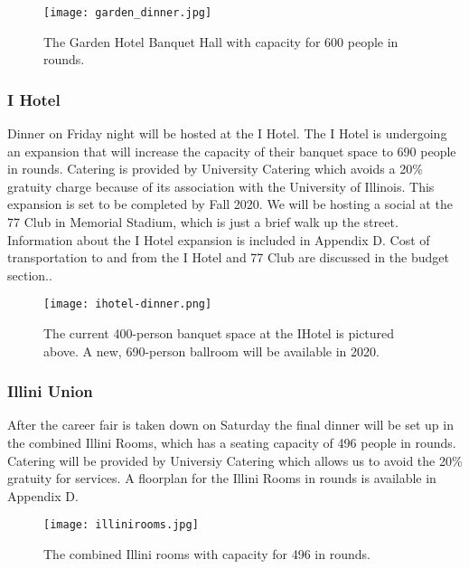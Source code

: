 \begin{figure}[H]
    \centering
    \texttt{[image: garden\_dinner.jpg]}
    \caption{The Garden Hotel Banquet Hall with capacity for 600 people in rounds.}
\end{figure}

\subsubsection{I Hotel}
Dinner on Friday night will be hosted at the I Hotel. The I Hotel is undergoing an expansion that will increase the capacity of their banquet space to 690 people in rounds. Catering is provided by University Catering which avoids a 20\% gratuity charge because of its association with the University of Illinois. This expansion is set to be completed by Fall 2020. We will be hosting a social at the 77 Club in Memorial Stadium, which is just a brief walk up the street. Information about the I Hotel expansion is included in Appendix D. Cost of transportation to and from the I Hotel and 77 Club are discussed in the budget section..

\begin{figure}[H]
    \centering
    \texttt{[image: ihotel-dinner.png]}
    \caption{The current 400-person banquet space at the IHotel is pictured 
        above. A new, 690-person ballroom will be available in 2020.}
\end{figure}

\subsubsection{Illini Union}
After the career fair is taken down on Saturday the final dinner will be set up in the combined Illini Rooms, which has a seating capacity of 496 people in rounds. Catering will be provided by Universiy Catering which allows us to avoid the 20\% gratuity for services. A floorplan for the Illini Rooms in rounds is available in Appendix D.\\

\begin{figure}[H]
    \centering
    \texttt{[image: illinirooms.jpg]}
    \caption{The combined Illini rooms with capacity for 496 in rounds.}
\end{figure}


